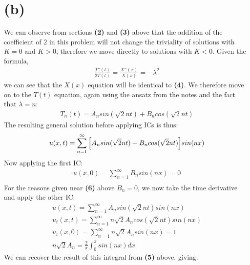 \documentclass{article}
\begin{document}
\section*{\textbf{(b)}}
We can observe from sections \textbf{(2)} and \textbf{(3)} above that the addition of the coefficient of $2$ in this problem will not change the triviality of solutions with $K=0$ and $K>0$, therefore we move directly to solutions with $K<0$. Given the formula,
\begin{equation}
\begin{aligned}
\frac{T''(t)}{2T(t)} = \frac{X''(x)}{X(x)} = -\lambda^2
\end{aligned}
\end{equation}
we can see that the $X(x)$ equation will be identical to \textbf{(4)}. We therefore move on to the $T(t)$ equation, again using the ansatz from the notes and the fact that $\lambda = n$:
\begin{equation}
\begin{aligned}
T_n(t) = A_nsin(\sqrt{2}nt) + B_ncos(\sqrt{2}nt)
\end{aligned}
\end{equation}
The resulting general solution before applying ICs is thus:
\begin{equation}
\begin{aligned}
u(x,t) = \sum^{\infty}_{n=1}\Big{[}A_nsin(\sqrt{2}nt) + B_ncos(\sqrt{2}nt)\Big{]}sin(nx)
\end{aligned}
\end{equation}
Now applying the first IC:
\begin{equation}
\begin{aligned}
u(x,0) = \sum_{n=1}^{\infty}B_nsin(nx) = 0\\
\end{aligned}
\end{equation}
For the reasons given near \textbf{(6)} above $B_n=0$, we now take the time derivative and apply the other IC:
\begin{equation}
\begin{aligned}
u(x,t) = \sum_{n=1}^{\infty}A_nsin(\sqrt{2}nt)sin(nx)\\
u_t(x,t) = \sum_{n=1}^{\infty}n\sqrt{2}A_ncos(\sqrt{2}nt)sin(nx)\\
u_t(x,0) = \sum_{n=1}^{\infty}n\sqrt{2}A_nsin(nx) = 1\\
n\sqrt{2}A_n = \frac{2}{\pi}\int^\pi_0sin(nx)dx
\end{aligned}
\end{equation}
We can recover the result of this integral from \textbf{(5)} above, giving:
\end{document}
